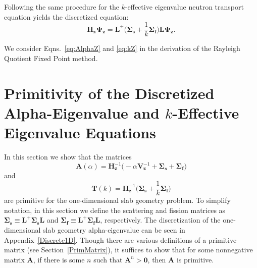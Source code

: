 Following the same procedure for the $k$-effective eigenvalue neutron transport equation yields the discretized equation:
\begin{equation}
	\boxed{\mathbf{H_{z}} \mathbf{\Psi_{z}} = \mathbf{L}^{+} \bigg ( \mathbf{\Sigma_{s}} + \frac{1}{k}\mathbf{\Sigma_{f}} \bigg ) \mathbf{L} \mathbf{\Psi_{z}}.}
	\label{eq:kZ}
\end{equation}

We consider Eqns.~\ref{eq:AlphaZ} and \ref{eq:kZ} in the derivation of the Rayleigh Quotient Fixed Point method.


%

\section{Primitivity of the Discretized Alpha-Eigenvalue and $k$-Effective Eigenvalue Equations}
\label{sec:PrimPos}

In this section we show that the matrices 
\begin{equation}
\mathbf{A}(\alpha) = \mathbf{H}_{\mathbf{z}}^{-1} \big (-\alpha \mathbf{V}_{\mathbf{z}}^{-1} + \mathbf{\Sigma_{s}} + \mathbf{\Sigma_{f}} \big)
\end{equation}
and
\begin{equation}
\mathbf{T}(k) = \mathbf{H}_{\mathbf{z}}^{-1} \bigg (\mathbf{\Sigma_{s}} + \frac{1}{k}\mathbf{\Sigma_{f}} \bigg)
\end{equation}
are primitive for the one-dimensional slab geometry problem. To simplify notation, in this section we define the scattering and fission matrices as $\mathbf{\Sigma_{s}} \equiv \mathbf{L}^{+}\mathbf{\Sigma_{s}} \mathbf{L}$ and $\mathbf{\Sigma_{f}} \equiv \mathbf{L}^{+}\mathbf{\Sigma_{f}} \mathbf{L}$, respectively. The discretization of the one-dimensional slab geometry alpha-eigenvalue can be seen in Appendix~\ref{Discrete1D}. Though there are various definitions of a primitive matrix (see Section~\ref{PrimMatrix}), it suffices to show that for some nonnegative matrix $\mathbf{A}$, if there is some $n$ such that $\mathbf{A}^{n} > \mathbf{0}$, then $\mathbf{A}$ is primitive.

